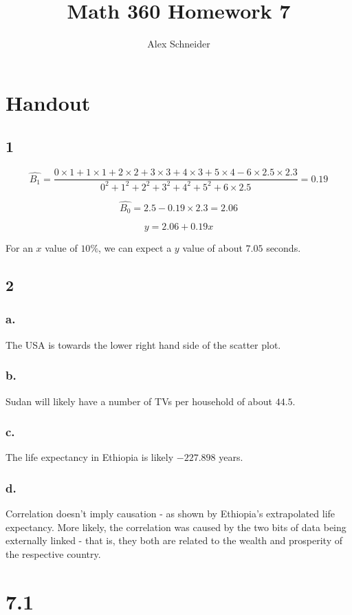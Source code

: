 \documentclass[11pt]{article}
\title{Math 360 Homework 7}
\author{Alex Schneider}
\begin{document}
\maketitle
\section{Handout}
\subsection{1}
\[ \hat{B_1} = \frac{
    0\times1+1\times1+2\times2+3\times3+4\times3+5\times4 - 6\times2.5\times2.3
}{0^2+1^2+2^2+3^2+4^2+5^2+6\times2.5} = 0.19 \]

\[ \hat{B_0} = 2.5 - 0.19\times2.3 = 2.06 \]

\[ y = 2.06 + 0.19x \]

For an $x$ value of $10\%$, we can expect a $y$ value of about $7.05$
seconds.

\subsection{2}
\subsubsection{a.}
The USA is towards the lower right hand side of the scatter plot. 

\subsubsection{b.}
Sudan will likely have a number of TVs per household of about $44.5$.

\subsubsection{c.}
The life expectancy in Ethiopia is likely $-227.898$ years. 

\subsubsection{d.}
Correlation doesn't imply causation - as shown by Ethiopia's extrapolated life
expectancy. More likely, the correlation was caused by the two bits of data
being externally linked - that is, they both are related to the wealth and
prosperity of the respective country. 

\section{7.1}
\end{document}
